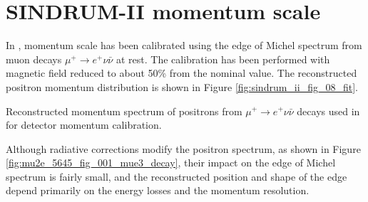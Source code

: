 \newpage
\section {SINDRUM-II momentum scale }

In \cite{sindrum_ii:Bertl2006}, momentum scale has been calibrated using
the edge of Michel spectrum from muon decays $\mu^+ \rightarrow e^+ \nu \bar{\nu}$
at rest. The calibration has been performed with magnetic field reduced to about 50\%
from the nominal value. The reconstructed positron momentum distribution is shown
in Figure \ref{fig:sindrum_ii_fig_08_fit}.

\vspace{0.1in}
 {
  \label{fig:sindrum_ii_fig_08_fit}
  Reconstructed momentum spectrum of positrons from $\mu^+ \rightarrow e^+ \nu \bar{\nu}$
  decays used in \cite{sindrum_ii:Bertl2006} for detector momentum calibration.
}
\vspace{0.1in}

Although radiative corrections modify the positron spectrum, as shown in Figure  \ref{fig:mu2e_5645_fig_001_mue3_decay}, their impact on the edge of Michel spectrum
is fairly small, and the reconstructed position and shape of the edge depend primarily
on the energy losses and the momentum resolution.

